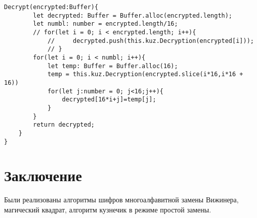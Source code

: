 \begin{lstlisting}[caption={Шифр Магический квадрат}, label=lst:2]
	Decrypt(encrypted:Buffer){
		let decrypted: Buffer = Buffer.alloc(encrypted.length);
		let numbl: number = encrypted.length/16;
		// for(let i = 0; i < encrypted.length; i++){
			//     decrypted.push(this.kuz.Decryption(encrypted[i]));
			// }
		for(let i = 0; i < numbl; i++){
			let temp: Buffer = Buffer.alloc(16);
			temp = this.kuz.Decryption(encrypted.slice(i*16,i*16 + 16))
			for(let j:number = 0; j<16;j++){
				decrypted[16*i+j]=temp[j];
			}
		}
		return decrypted;
	}
}
\end{lstlisting}



\section*{Заключение}
{}

Были реализованы алгоритмы шифров многоалфавитной замены Вижинера, магический квадрат, алгоритм кузнечик в режиме простой замены.


